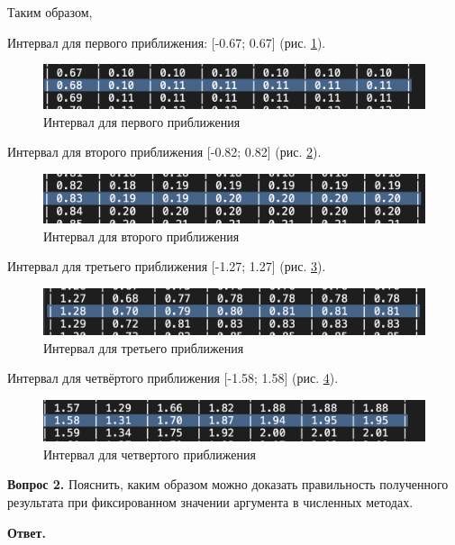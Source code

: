 \documentclass[12pt]{report}
\begin{document}
Таким образом, 

Интервал для первого приближения: [-0.67; 0.67] (рис. \ref{1approx}).

\begin{figure}[h!p]
	\centering
	\includegraphics[scale = 0.6]{1.png}
	\caption{Интервал для первого приближения}
	\label{1approx}
\end{figure}

Интервал для второго приближения [-0.82; 0.82] (рис. \ref{2approx}).

\begin{figure}[h!p]
	\centering
	\includegraphics[scale = 0.6]{2.png}
	\caption{Интервал для второго приближения}
	\label{2approx}
\end{figure}

Интервал для третьего приближения [-1.27; 1.27] (рис. \ref{3approx}).

\begin{figure}[h!p]
	\centering
	\includegraphics[scale = 0.6]{3.png}
	\caption{Интервал для третьего приближения}
	\label{3approx}
\end{figure}

Интервал для четвёртого приближения [-1.58; 1.58] (рис. \ref{4approx}).

\begin{figure}[h!p]
	\centering
	\includegraphics[scale = 0.6]{4.png}
	\caption{Интервал для четвертого приближения}
	\label{4approx}
\end{figure}
\newpage
\textbf{Вопрос 2.} Пояснить, каким образом можно доказать правильность полученного результата при фиксированном значении аргумента в численных методах.
	
\textbf{Ответ.} 
\end{document}
